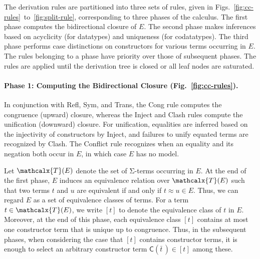 \documentclass[smallcondensed,draft]{svjour3}
\newcommand\Sig{\mathrm{\Sigma}}
\newcommand\const[1]{\textsf{#1}}
\renewcommand{\vec}[1]{\bar #1}
\newcommand{\Ec}{E}
\newcommand{\tEc}{\Terms(\Ec)}
\newcommand{\rn}[1]{\textsf{#1}}
\newcommand{\teq}{\approx}
\newcommand{\ec}[1]{[#1]}
\newcommand\Terms{\mathcalx{T}}
\newcommand\negvthinspace{\kern-0.083333em}
\begin{document}
The derivation rules are partitioned into three sets of rules, given in
Figs.\ \ref{fig:cc-rules}~to~\ref{fig:split-rule}, corresponding to three
phases of the calculus. The first phase computes the bidirectional closure of $\Ec$. The second
phase makes inferences based on acyclicity (for datatypes) and uniqueness
(for codatatypes).
The third phase performs case distinctions on constructors for
various terms occurring in $\Ec$.
%
The rules belonging to a phase have priority over those of %
subsequent
phases. The rules are applied until the derivation tree is closed or all leaf nodes
are saturated.


\paragraph{Phase 1: Computing the Bidirectional Closure \rm(Fig.~\ref{fig:cc-rules}).}
In conjunction with \rn{Refl}, \rn{Sym}, and \rn{Trans}, the \rn{Cong} rule computes the congruence (upward) closure,
whereas the \rn{Inject} and \rn{Clash} rules %
compute the unification (downward) closure.
For unification, %
equalities are inferred based on the injectivity of constructors by \rn{Inject},
and failures to unify equated terms are recognized by \rn{Clash}.
The \rn{Conflict} rule recognizes when an equality and its negation both occur in $\Ec$, in which case $\Ec$ has no model.

Let $\tEc$ denote the set of $\Sig$-terms occurring in $\Ec$.
At the end of the first phase, $\Ec$ induces an equivalence
relation over $\tEc$ such that two terms $t$ and $u$ are equivalent if and
only if $t \teq u \in \Ec$.
Thus, we can regard $\Ec$ as a set of
equivalence classes of terms. For a term $t \in \tEc$, we write $\ec{t}$ to
denote the equivalence class of $t$ in $\Ec$.
Moreover, at the end of this phase, each equivalence class $\ec{t}$ contains
at most %
one constructor term that is unique up to congruence.
Thus, in the subsequent phases, 
when considering the case that $\ec{t}$ contains constructor terms,
it is enough %
to select an arbitrary constructor term $\const{C}( \vec t\, ) \in \ec{t}$ among these.
\end{document}

